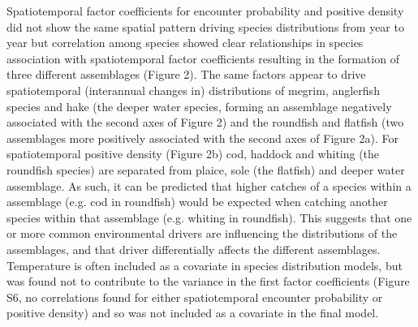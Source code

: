 \documentclass[fleqn,10pt]{wlscirep}
\begin{document}
\begin{linenumbers}
Spatiotemporal factor coefficients for encounter probability and positive
density did not show the same spatial pattern driving species distributions
from year to year but correlation among species showed clear relationships in
species association with spatiotemporal factor coefficients resulting in the
formation of three different assemblages (Figure 2). The same factors appear
to drive spatiotemporal (interannual changes in) distributions of megrim,
anglerfish species and hake (the deeper water species, forming an assemblage
negatively associated with the second axes of Figure 2) and the roundfish and
flatfish (two assemblages more positively associated with the second axes of
Figure 2a). For spatiotemporal positive density (Figure 2b) cod, haddock and
whiting (the roundfish species) are separated from plaice, sole (the flatfish)
and deeper water assemblage. As such, it can be predicted that higher catches
of a species within a assemblage (e.g. cod in roundfish) would be expected when
catching another species within that assemblage (e.g. whiting in roundfish).
This suggests that one or more common environmental drivers are influencing the
distributions of the assemblages, and that driver differentially affects the
different assemblages. Temperature is often included as a covariate in species
distribution models, but was found not to contribute to the variance in the
first factor coefficients (Figure S6, no correlations found for either
spatiotemporal encounter probability or positive density) and so was not
included as a covariate in the final model.\\


\end{linenumbers}
\end{document}
